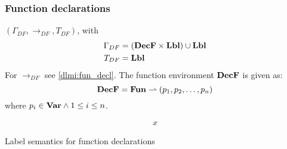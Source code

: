 \subsubsection{Function declarations}
$(\Gamma_{DF}, \rightarrow_{DF}, T_{DF})$, with
\begin{align*}
  \Gamma_{DF} & = (\mathbf{DecF} \times \mathbf{Lbl}) \cup \mathbf{Lbl} \\
  T_{DF} & = \mathbf{Lbl}
\end{align*}
For $\rightarrow_{DF}$ see \cref{dlmi:fun_decl}.
The function environment $\mathbf{DecF}$ is given as:
\[ \mathbf{DecF} = \mathbf{Fun} \rightharpoonup (p_1, p_2, \dots, p_n) \]
where $p_i \in \mathbf{Var} \land 1 \leq i \leq n$.

\begin{table}
\begin{align*}
  x
\end{align*}
\caption{Label semantics for function declarations}
\label{dlmi:fun_decl}
\end{table}


